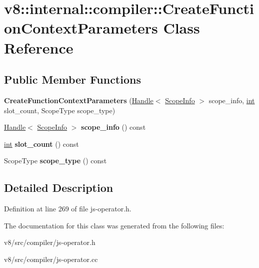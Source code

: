 \hypertarget{classv8_1_1internal_1_1compiler_1_1CreateFunctionContextParameters}{}\section{v8\+:\+:internal\+:\+:compiler\+:\+:Create\+Function\+Context\+Parameters Class Reference}
\label{classv8_1_1internal_1_1compiler_1_1CreateFunctionContextParameters}
\subsection*{Public Member Functions}
\begin{DoxyCompactItemize}
\item 
\mbox{\label{classv8_1_1internal_1_1compiler_1_1CreateFunctionContextParameters_a1316c708afc12ce6ca6f9402b399226a}} 
{\bfseries Create\+Function\+Context\+Parameters} (\mbox{\hyperlink{classv8_1_1internal_1_1Handle}{Handle}}$<$ \mbox{\hyperlink{classv8_1_1internal_1_1ScopeInfo}{Scope\+Info}} $>$ scope\+\_\+info, \mbox{\hyperlink{classint}{int}} slot\+\_\+count, Scope\+Type scope\+\_\+type)
\item 
\mbox{\label{classv8_1_1internal_1_1compiler_1_1CreateFunctionContextParameters_ac7f1e4bbc81a84133d1fb4e68b9e1fda}} 
\mbox{\hyperlink{classv8_1_1internal_1_1Handle}{Handle}}$<$ \mbox{\hyperlink{classv8_1_1internal_1_1ScopeInfo}{Scope\+Info}} $>$ {\bfseries scope\+\_\+info} () const
\item 
\mbox{\label{classv8_1_1internal_1_1compiler_1_1CreateFunctionContextParameters_a2c84fd991ada9cd7c0a542a353013764}} 
\mbox{\hyperlink{classint}{int}} {\bfseries slot\+\_\+count} () const
\item 
\mbox{\label{classv8_1_1internal_1_1compiler_1_1CreateFunctionContextParameters_a170bdcf14260e3b182ffeddfc070d160}} 
Scope\+Type {\bfseries scope\+\_\+type} () const
\end{DoxyCompactItemize}


\subsection{Detailed Description}


Definition at line 269 of file js-\/operator.\+h.



The documentation for this class was generated from the following files\+:\begin{DoxyCompactItemize}
\item 
v8/src/compiler/js-\/operator.\+h\item 
v8/src/compiler/js-\/operator.\+cc\end{DoxyCompactItemize}
